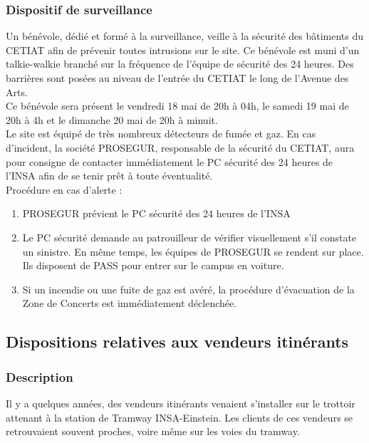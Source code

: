 \documentclass[hidelinks, paper=a4, fontsize=13pt]{report}
\begin{document}
\subsubsection{Dispositif de surveillance}
Un bénévole, dédié et formé à la surveillance, veille à la sécurité des bâtiments du CETIAT afin de prévenir toutes intrusions sur le site. Ce bénévole est muni d’un talkie-walkie branché sur la fréquence de l'équipe de sécurité des 24 heures. Des barrières sont posées au niveau de l’entrée du CETIAT le long de l’Avenue des Arts.\\
Ce bénévole sera présent le vendredi 18 mai de 20h à 04h, le samedi 19 mai de 20h à 4h et le dimanche 20 mai de 20h à minuit. \\

Le site est équipé de très nombreux détecteurs de fumée et gaz. En cas d’incident, la société PROSEGUR, responsable de la sécurité du CETIAT, aura pour consigne de contacter immédiatement le PC sécurité des 24 heures de l’INSA afin de se tenir prêt à toute éventualité.\\

Procédure en cas d’alerte :
\begin{enumerate}
	\item PROSEGUR prévient le PC sécurité des 24 heures de l’INSA
	\item Le PC sécurité demande au patrouilleur de vérifier visuellement s’il constate un sinistre. En même temps, les équipes de PROSEGUR se rendent sur place. Ils disposent de PASS pour entrer sur le campus en voiture.
	\item Si un incendie ou une fuite de gaz est avéré, la procédure d’évacuation de la Zone de Concerts est immédiatement déclenchée.
\end{enumerate}

\subsection{Dispositions relatives aux vendeurs itinérants}
\subsubsection{Description}

Il y a quelques années, des vendeurs itinérants venaient s’installer sur le trottoir attenant à la station de Tramway INSA-Einstein. Les clients de ces vendeurs se retrouvaient souvent proches, voire même sur les voies du tramway.  \\
\end{document}
